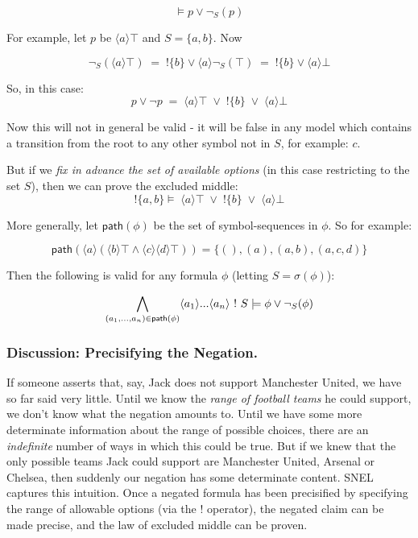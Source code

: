 \[
\models p \lor \neg_S(p)
\]

\NI For example, let $p$ be $\langle a \rangle \top$ and $S = \{a,
b\}$.  Now

\[
\neg_S(\langle a \rangle \top) \; = \; ! \{b\} \lor \langle a \rangle \neg_S(\top) \; =  \; ! \{b\} \lor \langle a \rangle \bot
\]

\NI So, in this case:
\[
p \lor \neg p \; = \; \langle a \rangle \top \; \lor \; ! \{b\} \; \lor \; \langle a \rangle \bot
\]

\NI Now this will not in general be valid - it will be false in any model
which contains a transition from the root to any other symbol not in
$S$, for example: $c$.

But if we \emph{fix in advance the set of available options} (in this
case restricting to the set $S$), then we can prove the excluded
middle:
\[
!\{a, b\} \models \; \langle a \rangle \top \; \lor \; ! \{b\} \; \lor \; \langle a \rangle \bot
\]

\NI More generally, let $\mathsf{path}(\phi)$ be the set of
symbol-sequences in $\phi$.  So for example:

\[
\mathsf{path}(\langle a \rangle (\langle b \rangle \top \land \langle c \rangle \langle d \rangle \top)) = \{(), (a), (a, b), (a, c, d)\}
\]

\NI Then the following is valid for any formula $\phi$ (letting
$S = \sigma(\phi)$):

\[
\bigwedge_{(a_1, ..., a_n) \in \mathsf{path}(\phi)} \langle a_1 \rangle ... \langle a_n \rangle \ ! \  S \models \phi \lor \neg_S (\phi)
\]

\subsubsection{Discussion: Precisifying the Negation. }

\NI If someone asserts that, say, Jack does not support Manchester United,
we have so far said very little.  Until we know the \emph{range of
  football teams} he could support, we don't know what the negation
amounts to.  Until we have some more determinate information about the
range of possible choices, there are an \emph{indefinite} number of
ways in which this could be true.  But if we knew that the only
possible teams Jack could support are Manchester United, Arsenal or
Chelsea, then suddenly our negation has some determinate content.
SNEL captures this intuition.  Once a negated formula has been
precisified by specifying the range of allowable options (via the $!$
operator), the negated claim can be made precise, and the law of
excluded middle can be proven.


